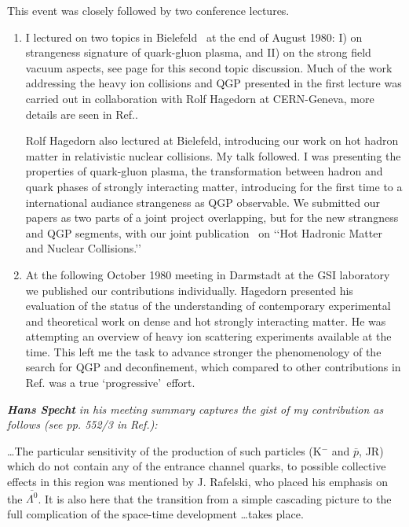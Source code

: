 This event was closely followed by two conference lectures.
\begin{enumerate}
\item
I lectured on two topics in Bielefeld~\cite{Satz:1980Bil} at the end of August 1980: I) on strangeness signature of quark-gluon plasma, and II) on the strong field vacuum aspects, see page \pageref{JRVac} for this second topic discussion. Much of the work addressing the heavy ion collisions and QGP presented in the first lecture was carried out in collaboration with Rolf Hagedorn at CERN-Geneva, more details are seen in Ref.\cite{Rafelski:2016hnq}.

Rolf Hagedorn also lectured at Bielefeld, introducing our work on hot hadron matter in relativistic nuclear collisions. My talk followed. I was presenting the properties of quark-gluon plasma, the transformation between hadron and quark phases of strongly interacting matter, introducing for the first time to a international audiance strangeness as QGP observable. We submitted our papers as two parts of a joint project overlapping, but for the new strangness and QGP segments, with our joint publication~\cite{Hagedorn:1980kb} on \lq\lq Hot Hadronic Matter and Nuclear Collisions.\rq\rq\ 
\item
At the following October 1980 meeting in Darmstadt at the GSI laboratory\cite{Bock:1980GSI} we published our contributions individually. Hagedorn presented his evaluation of the status of the understanding of contemporary experimental and theoretical work on dense and hot strongly interacting matter. He was attempting an overview of heavy ion scattering experiments available at the time. This left me the task to advance stronger the phenomenology of the search for QGP and deconfinement, which compared to other contributions in Ref.\cite{Bock:1980GSI} was a true \lq progressive\rq\ effort.\\
\end{enumerate}

\noindent\textit{\textbf{Hans Specht} in his meeting summary captures the gist of my contribution as follows (see pp. 552/3 in Ref.\cite{Bock:1980GSI}):}\\[-0.7cm]
\begin{mdframed}[linecolor=gray,roundcorner=12pt,backgroundcolor=GreenYellow!15,linewidth=1pt,leftmargin=0cm,rightmargin=0cm,topline=true,bottomline=true,skipabove=12pt]\relax%
%
\label{Specht} 
\ldots The particular sensitivity of the production of such particles (K$^-$ and $\bar p$, JR) which do not contain any of the entrance channel quarks, to possible collective effects in this region was mentioned by J. Rafelski, who placed his emphasis on the $\overline{\Lambda^0}$. It is also here that the transition from a simple cascading picture to the full complication of the space-time development \ldots takes place.
\end{mdframed}
\vskip 0.5cm

